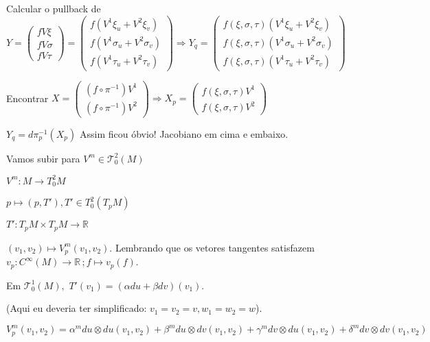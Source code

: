 \documentclass[10pt,a4paper]{article}
\begin{document}
		Calcular o pullback de $Y = \left( \begin{matrix} fV\xi \\ fV\sigma \\ f V \tau \end{matrix} \right) = \left( \begin{matrix}f(V^1 \xi_u + V^2 \xi_v) \\ f(V^1 \sigma_u + V^2 \sigma_v) \\ f (V^1 \tau_u + V^2 \tau_v) \end{matrix} \right) \Rightarrow Y_q = \left( \begin{matrix}f(\xi, \sigma, \tau) (V^1 \xi_u + V^2 \xi_v) \\ f(\xi, \sigma, \tau) (V^1 \sigma_u + V^2 \sigma_v) \\ f(\xi, \sigma, \tau) (V^1 \tau_u + V^2 \tau_v) \end{matrix} \right)$

		Encontrar $X = \left( \begin{matrix} (f \circ \pi^{-1}) V^1 \\  (f \circ \pi^{-1}) V^2 \end{matrix} \right) \Rightarrow X_p = \left( \begin{matrix} f(\xi, \sigma, \tau) V^1 \\ f(\xi, \sigma, \tau) V^2 \end{matrix} \right)$

		$Y_q = d\pi^{-1}_p (X_p)$ Assim ficou \'obvio! Jacobiano em cima e embaixo.

		\vspace{3mm}

		Vamos subir para $V^m \in \mathcal{T}_0^2(M)$

		$V^m : M \rightarrow T_0^2 M$

		$p \mapsto (p, T'), T' \in T_0^2(T_pM)$

		$T' : T_pM \times T_pM \rightarrow \mathbb{R}$

		$(v_1, v_2) \mapsto V_p^m(v_1, v_2)$. Lembrando que os vetores tangentes satisfazem $v_p : C^\infty(M) \rightarrow \mathbb{R} \,; f \mapsto v_p(f) $.

		Em $\mathcal{T}_0^1(M), \,\,T'(v_1) = (\alpha du + \beta dv) (v_1)$.

		(Aqui eu deveria ter simplificado: $v_1 = v_2 = v, w_1 = w_2 = w$).

		$V_p^m(v_1, v_2) = \alpha^m du \otimes du (v_1, v_2) + \beta^m du \otimes dv (v_1, v_2) + \gamma^m dv \otimes du (v_1, v_2) + \delta^m dv \otimes dv (v_1, v_2)$
\end{document}

